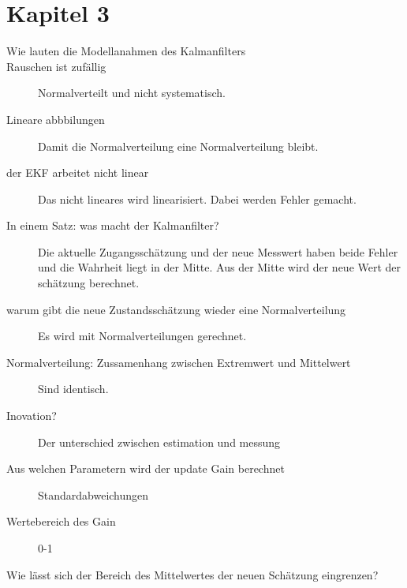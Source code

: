 \section{Kapitel 3}
\label{sec:faq:kap3}
\begin{description}
 	\item[Wie lauten die Modellanahmen des Kalmanfilters]
	\item[Rauschen ist zufällig] Normalverteilt und nicht systematisch.
	\item[Lineare abbbilungen] Damit die Normalverteilung eine Normalverteilung bleibt.
	\item[der EKF arbeitet nicht linear] Das nicht lineares wird linearisiert. Dabei werden Fehler gemacht.
	\item[In einem Satz: was macht der Kalmanfilter?] Die aktuelle Zugangsschätzung und der neue Messwert haben beide Fehler und die Wahrheit liegt in der Mitte. Aus der Mitte wird der neue Wert der schätzung berechnet.
	\item[warum gibt die neue Zustandsschätzung wieder eine Normalverteilung] Es wird mit Normalverteilungen gerechnet.
	\item[Normalverteilung: Zussamenhang zwischen Extremwert und Mittelwert] Sind identisch.
	\item[Inovation?] Der unterschied zwischen estimation und messung
	\item[Aus welchen Parametern wird der update Gain berechnet] Standardabweichungen
	\item[Wertebereich des Gain] 0-1
	\item[Wie lässt sich der Bereich des Mittelwertes der neuen Schätzung eingrenzen?]
	
\end{description}

